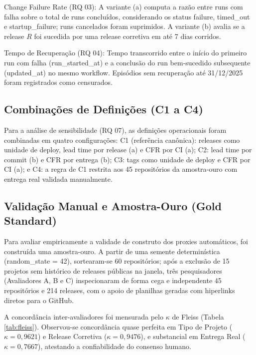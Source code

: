 \documentclass[12pt]{article}
\begin{document}
Change Failure Rate (RQ 03): A variante (a) computa a razão entre runs com falha sobre o total de runs concluídos, considerando os status failure, timed\_out e startup\_failure; runs cancelados foram suprimidos. A variante (b) avalia se a release $R$ foi sucedida por uma release corretiva em até 7 dias corridos.

Tempo de Recuperação (RQ 04): Tempo transcorrido entre o início do primeiro run com falha (run\_started\_at) e a conclusão do run bem-sucedido subsequente (updated\_at) no mesmo workflow. Episódios sem recuperação até 31/12/2025 foram registrados como censurados.

\subsection{Combinações de Definições (C1 a C4)}

Para a análise de sensibilidade (RQ 07), as definições operacionais foram combinadas em quatro configurações: C1 (referência canônica): releases como unidade de deploy, lead time por release (a) e CFR por CI (a); C2: lead time por commit (b) e CFR por entrega (b); C3: tags como unidade de deploy e CFR por CI (a); e C4: a regra de C1 restrita aos 45 repositórios da amostra-ouro com entrega real validada manualmente.

\subsection{Validação Manual e Amostra-Ouro (Gold Standard)}

Para avaliar empiricamente a validade de construto dos proxies automáticos, foi construída uma amostra-ouro. A partir de uma semente determinística (random\_state = 42), sortearam-se 60 repositórios; após a exclusão de 15 projetos sem histórico de releases públicas na janela, três pesquisadores (Avaliadores A, B e C) inspecionaram de forma cega e independente 45 repositórios e 214 releases, com o apoio de planilhas geradas com hiperlinks diretos para o GitHub.

A concordância inter-avaliadores foi mensurada pelo $\kappa$ de Fleiss (Tabela \ref{tab:fleiss}). Observou-se concordância quase perfeita em Tipo de Projeto ($\kappa = 0{,}9621$) e Release Corretiva ($\kappa = 0{,}9476$), e substancial em Entrega Real ($\kappa = 0{,}7667$), atestando a confiabilidade do consenso humano.
\end{document}

